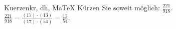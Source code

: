 \begin{MAufgabe}{Kuerzen}{kr, dh, MaTeX}
K\"urzen Sie soweit m\"oglich: $\frac{221}{918}$.\\ 
\ifLsg\MLoesung
\quad $\frac{221}{918}=\frac{(17)\cdot(13)}{(17)\cdot(54)}=\frac{13}{54}$.\else\relax\fi
 \end{MAufgabe}
